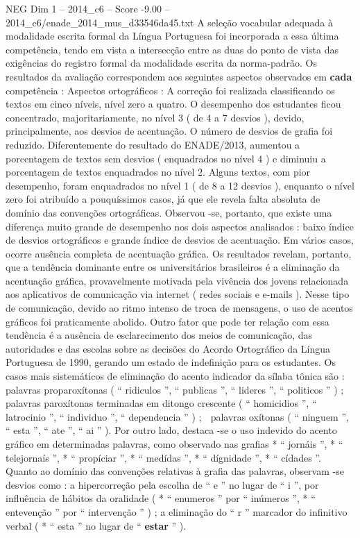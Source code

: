 \begin{textsample}{NEG Dim 1 – 2014\_c6 – Score -9.00 – 2014\_c6/enade\_2014\_mus\_d33546da45.txt}
A seleção vocabular adequada à modalidade escrita formal da Língua Portuguesa foi incorporada a essa última competência, tendo em vista a intersecção entre as duas do ponto de vista das exigências do registro formal da modalidade escrita da norma-padrão.
Os resultados da avaliação correspondem aos seguintes aspectos observados em \textbf{cada} competência : Aspectos ortográficos : A correção foi realizada classificando os textos em cinco níveis, nível zero a quatro.
O desempenho dos estudantes ficou concentrado, majoritariamente, no nível 3 ( de 4 a 7 desvios ), devido, principalmente, aos desvios de acentuação.
O número de desvios de grafia foi reduzido.
Diferentemente do resultado do ENADE/2013, aumentou a porcentagem de textos sem desvios ( enquadrados no nível 4 ) e diminuiu a porcentagem de textos enquadrados no nível 2.
Alguns textos, com pior desempenho, foram enquadrados no nível 1 ( de 8 a 12 desvios ), enquanto o nível zero foi atribuído a pouquíssimos casos, já que ele revela falta absoluta de domínio das convenções ortográficas.
Observou -se, portanto, que existe uma diferença muito grande de desempenho nos dois aspectos analisados : baixo índice de desvios ortográficos e grande índice de desvios de acentuação.
Em vários casos, ocorre ausência completa de acentuação gráfica.
Os resultados revelam, portanto, que a tendência dominante entre os universitários brasileiros é a eliminação da acentuação gráfica, provavelmente motivada pela vivência dos jovens relacionada aos aplicativos de comunicação via internet ( redes sociais e e-mails ).
Nesse tipo de comunicação, devido ao ritmo intenso de troca de mensagens, o uso de acentos gráficos foi praticamente abolido.
Outro fator que pode ter relação com essa tendência é a ausência de esclarecimento dos meios de comunicação, das autoridades e das escolas sobre as decisões do Acordo Ortográfico da Língua Portuguesa de 1990, gerando um estado de indefinição para os estudantes.
Os casos mais sistemáticos de eliminação do acento indicador da sílaba tônica são :  palavras proparoxítonas ( “ ridiculos ”, “ publicas ”, “ lideres ”, “ politicos ” ) ;  palavras paroxítonas terminadas em ditongo crescente ( “ homicidios ”, “ latrocinio ”, “ individuo ”, “ dependencia ” ) ;  palavras oxítonas ( “ ninguem ”, “ esta ”, “ ate ”, “ ai ” ).
Por outro lado, destaca -se o uso indevido do acento gráfico em determinadas palavras, como observado nas grafias * “ jornáis ”, * “ telejornaís ”, * “ propíciar ”, * “ medídas ”, * “ dígnidade ”, * “ cídades ”.
Quanto ao domínio das convenções relativas à grafia das palavras, observam -se desvios como : a hipercorreção pela escolha de “ e ” no lugar de “ i ”, por influência de hábitos da oralidade ( * “ enumeros ” por “ inúmeros ”, * “ entevenção ” por “ intervenção ” ) ; a eliminação do “ r ” marcador do infinitivo verbal ( * “ esta ” no lugar de “ \textbf{estar} ” ).

\end{textsample}
